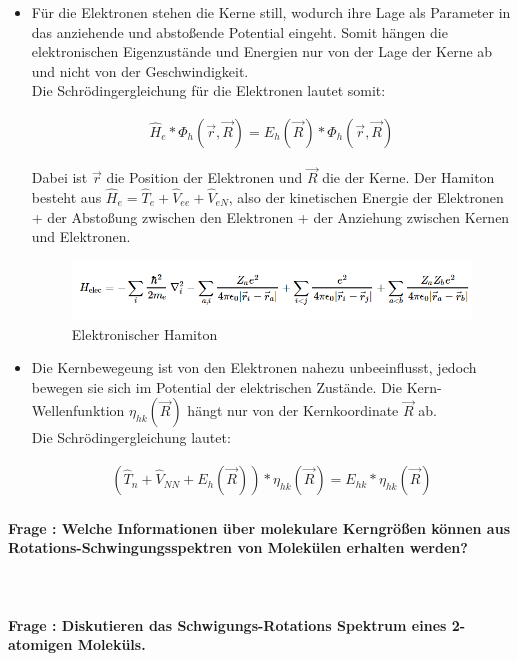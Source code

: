 \documentclass[a4paper, 11pt, ngerman, parskip=half-]{scrartcl}
\newcounter{question}
\newcommand{\question}[1]{\stepcounter{question}\paragraph{Frage \thequestion: #1}~}
\begin{document}
\begin{itemize}
    \item Für die Elektronen stehen die Kerne still, wodurch ihre Lage als Parameter in das anziehende und abstoßende Potential eingeht.
        Somit hängen die elektronischen Eigenzustände und Energien nur von der Lage der Kerne ab und nicht von der Geschwindigkeit.\\
            Die Schrödingergleichung für die Elektronen lautet somit:
            
        \begin{align}
            \hat{H}_e * \Phi_h(\vec{r},\vec{R}) = E_h(\vec{R}) *  \Phi_h(\vec{r},\vec{R})
        \end{align}

        Dabei ist $\vec{r}$ die Position der Elektronen und $\vec{R}$ die der Kerne. Der Hamiton besteht aus $\hat{H}_e = \hat{T}_e + \hat{V}_{ee} + \hat{V}_{eN}$, 
        also der kinetischen Energie der Elektronen + der Abstoßung zwischen den Elektronen + der Anziehung zwischen Kernen und Elektronen.

        \begin{figure}[H]
            \includegraphics[width=0.8\linewidth]{resources/09-05-2012/born_op.PNG}
            \caption{Elektronischer Hamiton}
        \end{figure}

    \item Die Kernbewegeung ist von den Elektronen nahezu unbeeinflusst, jedoch bewegen sie sich im Potential der elektrischen Zustände. 
        Die Kern-Wellenfunktion $\eta_{hk}(\vec{R})$ hängt nur von der Kernkoordinate $\vec{R}$ ab.\\
        Die Schrödingergleichung lautet: 

        \begin{align}
            (\hat{T}_n + \hat{V}_{NN} + E_h(\vec{R})) * \eta_{hk}(\vec{R}) = E_{hk} * \eta_{hk}(\vec{R})
        \end{align}
\end{itemize}



\question{Welche Informationen über molekulare Kerngrößen können aus Rotations-Schwingungsspektren von Molekülen erhalten werden?}
\label{q:22}

\question{Diskutieren das Schwigungs-Rotations Spektrum eines 2-atomigen Moleküls.}
\label{q:23}
\end{document}
